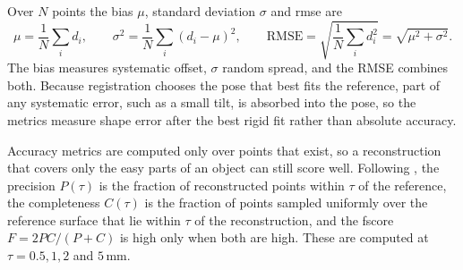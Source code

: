 Over $N$ points the bias $\mu$, standard deviation $\sigma$ and \gls{rmse} are
\begin{equation}
	\mu=\frac{1}{N}\sum_i d_i,\qquad
	\sigma^2=\frac{1}{N}\sum_i(d_i-\mu)^2,\qquad
	\mathrm{RMSE}=\sqrt{\frac{1}{N}\sum_i d_i^2}=\sqrt{\mu^2+\sigma^2}.
	\label{eq:rmse}
\end{equation}
The bias measures systematic offset, $\sigma$ random spread, and the RMSE combines both. Because registration chooses the pose that best fits the reference, part of any systematic error, such as a small tilt, is absorbed into the pose, so the metrics measure shape error after the best rigid fit rather than absolute accuracy.

Accuracy metrics are computed only over points that exist, so a reconstruction that covers only the easy parts of an object can still score well. Following \cite{knapitschTanksTemplesBenchmarking2017}, the precision $P(\tau)$ is the fraction of reconstructed points within $\tau$ of the reference, the completeness $C(\tau)$ is the fraction of points sampled uniformly over the reference surface that lie within $\tau$ of the reconstruction, and the \gls{fscore} $F=2PC/(P+C)$ is high only when both are high. These are computed at $\tau = 0.5, 1, 2$ and $5$\,mm.

